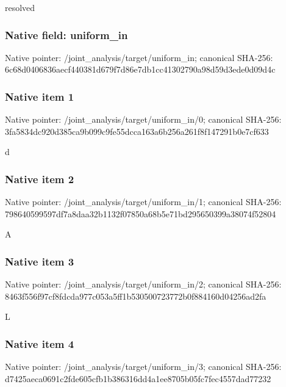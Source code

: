 \documentclass[10pt,a4paper]{article}
\begin{document}
\begingroup\raggedright\sloppy resolved\par\endgroup

\subsubsection{Native field: uniform\_\allowbreak{}in}
Native pointer: /joint\_\allowbreak{}analysis/target/uniform\_\allowbreak{}in; canonical SHA-256: 6c68d0406836aecf440381d679f7d86e7db1cc41302790a98d59d3ede0d09d4c

\subsubsection{Native item 1}
Native pointer: /joint\_\allowbreak{}analysis/target/uniform\_\allowbreak{}in/0; canonical SHA-256: 3fa5834dc920d385ca9b099c9fe55dcca163a6b256a261f8f147291b0e7cf633

\begingroup\raggedright\sloppy d\par\endgroup

\subsubsection{Native item 2}
Native pointer: /joint\_\allowbreak{}analysis/target/uniform\_\allowbreak{}in/1; canonical SHA-256: 798640599597df7a8daa32b1132f07850a68b5e71bd295650399a38074f52804

\begingroup\raggedright\sloppy A\par\endgroup

\subsubsection{Native item 3}
Native pointer: /joint\_\allowbreak{}analysis/target/uniform\_\allowbreak{}in/2; canonical SHA-256: 8463f556f97cf8fdcda977c053a5ff1b530500723772b0f884160d04256ad2fa

\begingroup\raggedright\sloppy L\par\endgroup

\subsubsection{Native item 4}
Native pointer: /joint\_\allowbreak{}analysis/target/uniform\_\allowbreak{}in/3; canonical SHA-256: d7425aeca0691c2fde605cfb1b386316dd4a1ee8705b05fc7fec4557dad77232
\end{document}
